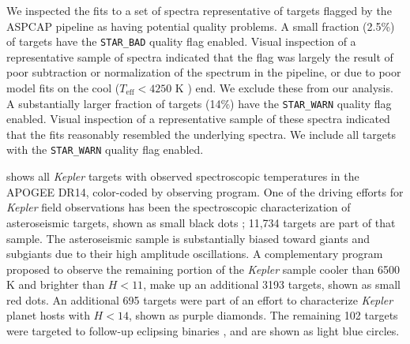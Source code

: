 \documentclass[twocolumn]{aastex6}
\newcommand{\Kepler}{\mbox{\textit{Kepler}}}
\newcommand{\Teff}{\ensuremath{T_{\textrm{eff}}}}
\newcommand{\MK}{\ensuremath{M_{Ks}}}
\newcommand{\STARBAD}{\texttt{STAR\_BAD}}
\newcommand{\STARWARN}{\texttt{STAR\_WARN}}
\begin{document}
We inspected the fits to a set of spectra representative of targets flagged 
by the ASPCAP pipeline as having potential quality problems. A small fraction
(2.5\%) of targets have the \STARBAD{} quality flag enabled. Visual inspection
of a representative sample of spectra indicated that the flag was largely the
result of poor subtraction or normalization of the spectrum in the pipeline, or
due to poor model fits on the cool (\(\Teff < 4250 \textrm{ K }\)) end. We exclude these
from our analysis. A substantially larger fraction of targets (14\%) have the 
\STARWARN{} quality flag enabled. Visual inspection of a representative sample 
of these spectra indicated that the fits reasonably resembled the underlying 
spectra. We include all targets with the \STARWARN{} quality flag enabled.

\begin{figure*}[htb]
    \centering
    \caption{\emph{Left:} \Teff-\MK{} diagram for the APOGEE observations of
        \Kepler{} targets. Asteroseismic targets are shown as black dots. The
        dwarf sample is shown as brown dots. The light blue dots indicate 
        eclipsing binary targets and purple dots are \Kepler{} Objects of 
        Interest. A binary sequence is clearly visible on the lower main
        sequence. Temperatures are spectroscopic APOGEE temperatures. A 
        representative error bar for the cool dwarf sample is 
        shown in the bottom-left corner, although the vertical error bar is too
        small to be easily visible. 1~Gyr MIST isochrone with \([Fe/H] = 0.5
            \textrm{ (dashed)}, 0.0 \textrm{ (solid), and } -0.5 \textrm{
        (dotted)}\) are displayed in pink.  \emph{Right:} A density plot of the 
        full APOGEE sample. To preserve the dynamic range of the dwarf 
        sequence, the red clump was allowed to saturate. The bin size is 100 K
    in temperature and 0.02 mag in \(Ks\)-band absolute 
magnitude.}\label{fig:apogee_selection}
\end{figure*}

 shows all \Kepler{} targets with observed
spectroscopic temperatures in the APOGEE DR14, color-coded by observing
program. One of the driving efforts for \Kepler{} field observations has been
the spectroscopic characterization of asteroseismic targets, shown as small
black dots \citep{Zasowski17,Pinsonneault18}; 11,734 targets are part of that
sample. The asteroseismic sample is substantially biased toward giants 
and subgiants due to their high amplitude oscillations. A complementary 
program proposed to observe the remaining portion of the \Kepler{} sample 
cooler than 6500 K and brighter than \(H < 11\), make up an additional 3193
targets, shown as small red dots. An additional 695 targets were part of an 
effort to characterize \Kepler{} planet hosts with \(H < 14\), shown as purple 
diamonds. The remaining 102 targets were targeted to follow-up 
eclipsing binaries \citep{Prsa11,Slawson11}, and are shown as light blue 
circles.  
\end{document}
